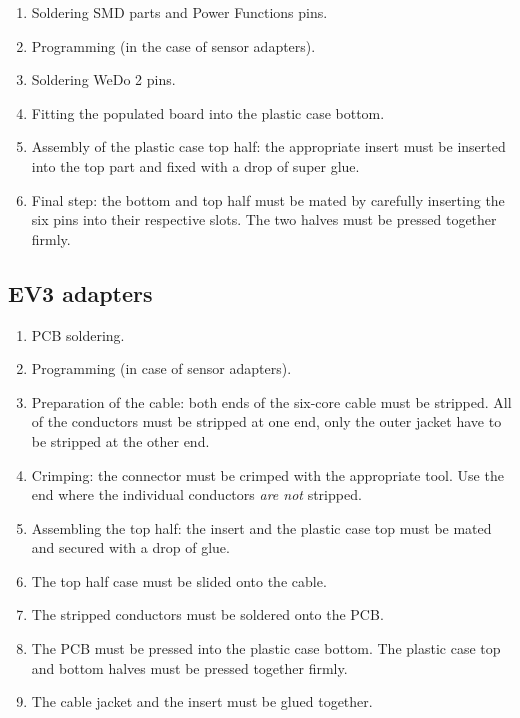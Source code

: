 \documentclass[a4paper,12pt]{article}
\begin{document}
\begin{enumerate}
    \item Soldering SMD parts and Power Functions pins.

    \item Programming (in the case of sensor adapters).

    \item Soldering WeDo 2 pins.

    \item Fitting the populated board into the plastic case bottom.

    \item Assembly of the plastic case top half: the appropriate insert must be
    inserted into the top part and fixed with a drop of super glue.

    \item Final step: the bottom and top half must be mated by carefully
    inserting the six pins into their respective slots. The two halves must be
    pressed together firmly.
\end{enumerate}

\subsection{EV3 adapters}

\begin{enumerate}
    \item PCB soldering.

    \item Programming (in case of sensor adapters).

    \item Preparation of the cable: both ends of the six-core cable must be
    stripped. All of the conductors must be stripped at one end, only the
    outer jacket have to be stripped at the other end.

    \item Crimping: the connector must be crimped with the appropriate tool.
    Use the end where the individual conductors \emph{are not} stripped.

    \item Assembling the top half: the insert and the plastic case top must
    be mated and secured with a drop of glue.

    \item The top half case must be slided onto the cable.

    \item The stripped conductors must be soldered onto the PCB.

    \item The PCB must be pressed into the plastic case bottom. The plastic
    case top and bottom halves must be pressed together firmly.

    \item The cable jacket and the insert must be glued together.
\end{enumerate}
\end{document}
